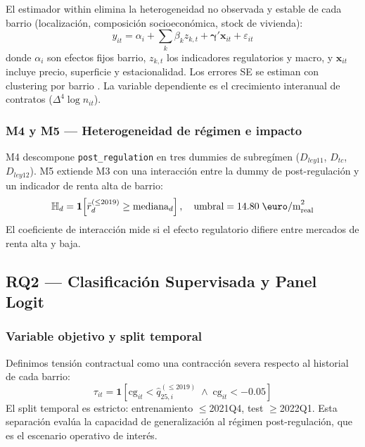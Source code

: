 \documentclass[10pt,a4paper,twocolumn]{article}
\begin{document}
El estimador within elimina la heterogeneidad no observada y estable de cada
barrio (localización, composición socioeconómica, stock de vivienda):
\begin{equation}
  y_{it} = \alpha_i + \sum_k \beta_k z_{k,t}
         + \boldsymbol{\gamma}'\mathbf{x}_{it} + \varepsilon_{it}
  \label{eq:panel}
\end{equation}
donde $\alpha_i$ son efectos fijos barrio, $z_{k,t}$ los indicadores regulatorios
y macro, y $\mathbf{x}_{it}$ incluye precio, superficie y estacionalidad.
Los errores SE se estiman con clustering por barrio \citep{baltagi2021econometric}.
La variable dependiente es el crecimiento interanual de contratos ($\Delta^4\log n_{it}$).

\subsubsection{M4 y M5 — Heterogeneidad de régimen e impacto}

M4 descompone \texttt{post\_regulation} en tres dummies de subregímen
($D_{ley11}$, $D_{tc}$, $D_{ley12}$). M5 extiende M3 con una interacción
entre la dummy de post-regulación y un indicador de renta alta de barrio:
\begin{equation}
  \mathbb{H}_d = \mathbf{1}\!\left[\bar{r}_d^{(\leq 2019)} \geq
  \text{mediana}_d\right], \quad
  \text{umbral} = 14.80\;\text{\euro/m}^2_\text{real}
  \label{eq:rentaalta}
\end{equation}
El coeficiente de interacción mide si el efecto regulatorio difiere entre
mercados de renta alta y baja.

\subsection{RQ2 — Clasificación Supervisada y Panel Logit}

\subsubsection{Variable objetivo y split temporal}

Definimos tensión contractual como una contracción severa respecto al historial
de cada barrio:
\begin{equation}
  \tau_{it} = \mathbf{1}\!\left[
    \text{cg}_{it} < \hat{q}_{25,i}^{(\leq 2019)} \;\wedge\;
    \text{cg}_{it} < -0.05
  \right]
  \label{eq:tension}
\end{equation}
El split temporal es estricto: entrenamiento $\leq$2021Q4, test $\geq$2022Q1.
Esta separación evalúa la capacidad de generalización al régimen post-regulación,
que es el escenario operativo de interés.
\end{document}
